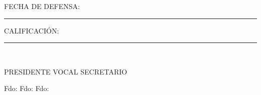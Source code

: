 \vspace*{0.5in}

FECHA DE DEFENSA: \hspace*{0.25in} \rule{87mm}{0.1mm}
\vspace*{0.1in}

CALIFICACIÓN:  \hspace*{0.69in} \rule{87mm}{0.1mm}\\

\vspace*{0.8in}

\hspace*{1in}PRESIDENTE \hspace*{0.6in}VOCAL \hspace*{0.6in}SECRETARIO

\vspace*{1in}

\hspace*{1in}Fdo: \hspace*{1.4in}Fdo: \hspace*{1.3in}Fdo:
